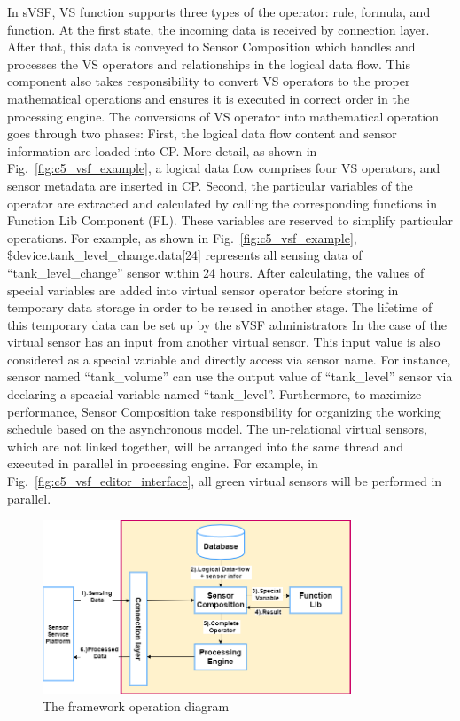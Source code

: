 In sVSF, VS function supports three types of the operator: rule, formula, and function. At the first state, the incoming data is received by connection layer. After that, this data is conveyed to Sensor Composition which handles and processes the VS operators and relationships in the logical data flow. This component also takes responsibility to convert VS operators to the proper mathematical operations and ensures it is executed in correct order in the processing engine. The conversions of VS operator into mathematical operation goes through two phases: First, the logical data flow content and sensor information are loaded into CP. More detail, as shown in Fig.~\ref{fig:c5_vsf_example}, a logical data flow comprises four VS operators, and sensor metadata are inserted in CP. Second, the particular variables of the operator are extracted and calculated by calling the corresponding functions in Function Lib Component (FL). These variables are reserved to simplify particular operations. For example, as shown in Fig.~\ref{fig:c5_vsf_example},  \$device.tank\_level\_change.data[24] represents all sensing data of “tank\_level\_change” sensor within 24 hours. After calculating, the values of special variables are added into virtual sensor operator before storing in temporary data storage in order to be reused in another stage. The lifetime of this temporary data can be set up by the sVSF administrators In the case of the virtual sensor has an input from another virtual sensor. This input value is also considered as a special variable and directly access via sensor name. For instance, sensor named “tank\_volume” can use the output value of “tank\_level” sensor via declaring a speacial variable named “tank\_level”. Furthermore, to maximize performance, Sensor Composition take responsibility for organizing the working schedule based on the asynchronous model. The un-relational virtual sensors, which are not linked together, will be arranged into the same thread and executed in parallel in processing engine. For example, in Fig.~\ref{fig:c5_vsf_editor_interface}, all green virtual sensors will be performed in parallel. \\

\begin{figure}[h!] 
 \begin{center} 
 \includegraphics[width=0.82\textwidth]{./Part2/Chapter5/figures/vsf_operation_diagram.png} 
    \caption{The framework operation diagram}
     \label{fig:c5_vsf_operation_diagram}
  \end{center} 
\end{figure}

